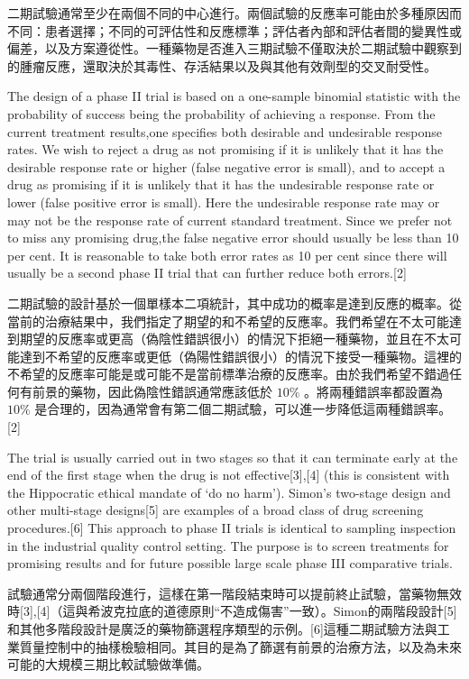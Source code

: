 二期試驗通常至少在兩個不同的中心進行。兩個試驗的反應率可能由於多種原因而不同：患者選擇；不同的可評估性和反應標準；評估者內部和評估者間的變異性或偏差，以及方案遵從性。一種藥物是否進入三期試驗不僅取決於二期試驗中觀察到的腫瘤反應，還取決於其毒性、存活結果以及與其他有效劑型的交叉耐受性。

The design of a phase II trial is based on a one-sample binomial statistic with the probability of success being the probability of achieving a response. From the current treatment results,one specifies both desirable and undesirable response rates. We wish to reject a drug as not promising if it is unlikely that it has the desirable response rate or higher (false negative error is small), and to accept a drug as promising if it is unlikely that it has the undesirable response rate or lower (false positive error is small). Here the undesirable response rate may or may not be the response rate of current standard treatment. Since we prefer not to miss any promising drug,the false negative error should usually be less than 10 per cent. It is reasonable to take both error rates as 10 per cent since there will usually be a second phase II trial that can further reduce both errors.[2]

二期試驗的設計基於一個單樣本二項統計，其中成功的概率是達到反應的概率。從當前的治療結果中，我們指定了期望的和不希望的反應率。我們希望在不太可能達到期望的反應率或更高（偽陰性錯誤很小）的情況下拒絕一種藥物，並且在不太可能達到不希望的反應率或更低（偽陽性錯誤很小）的情況下接受一種藥物。這裡的不希望的反應率可能是或可能不是當前標準治療的反應率。由於我們希望不錯過任何有前景的藥物，因此偽陰性錯誤通常應該低於 $10\%$ 。將兩種錯誤率都設置為 $10\%$ 是合理的，因為通常會有第二個二期試驗，可以進一步降低這兩種錯誤率。[2]

The trial is usually carried out in two stages so that it can terminate early at the end of the first stage when the drug is not effective[3],[4] (this is consistent with the Hippocratic ethical mandate of ‘do no harm’). Simon’s two-stage design and other multi-stage designs[5] are examples of a broad class of drug screening procedures.[6] This approach to phase II trials is identical to sampling inspection in the industrial quality control setting. The purpose is to screen treatments for promising results and for future possible large scale phase III comparative trials.

試驗通常分兩個階段進行，這樣在第一階段結束時可以提前終止試驗，當藥物無效時[3],[4]（這與希波克拉底的道德原則“不造成傷害”一致）。Simon的兩階段設計[5]和其他多階段設計是廣泛的藥物篩選程序類型的示例。[6]這種二期試驗方法與工業質量控制中的抽樣檢驗相同。其目的是為了篩選有前景的治療方法，以及為未來可能的大規模三期比較試驗做準備。

